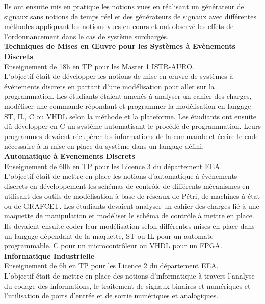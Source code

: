 \documentclass[11pt,a4paper,sans]{moderncv}         %
\begin{document}
{  Ils ont ensuite mis en pratique les notions vues en r\'ealisant un g\'en\'erateur de signaux sans notions de temps r\'eel et des g\'en\'erateurs de signaux avec diff\'erentes m\'ethodes appliquant les notions vues en cours et ont observ\'e les effets de l'ordonnancement dans le cas de syst\`eme surcharg\'es.\\
  \textbf{Techniques de Mises en \OE uvre pour les Syst\`emes \`a Ev\`enements Discrets}\\
  Enseignement de 18h en TP pour les Master 1 ISTR-AURO.\\
  L'objectif \'etait de d\'evelopper les notions de mise en \oe uvre de syst\`emes \`a \'ev\'enements discrets en partant d'une mod\'elisation pour aller sur la programmation.
  Les \'etudiants \'etaient amen\'es \`a analyser un cahier des charges, mod\'eliser une commande r\'epondant et programmer la mod\'elisation en langage ST, IL, C ou VHDL selon la m\'ethode et la plateforme.
  Les \'etudiants ont ensuite d\^u d\'evelopper en C un syst\`eme automatisant le proc\'ed\'e de programmation.
  Leurs programmes devaient r\'ecup\'erer les informations de la commande et \'ecrire le code n\'ecessaire \`a la mise en place du syst\`eme dans un langage d\'efini.\\
  \textbf{Automatique \`a Evenements Discrets}\\
  Enseignement de 60h en TP pour les Licence 3 du d\'epartement EEA.\\
  L'objectif \'etait de mettre en place les notions d'automatique \`a \'ev\'enements discrets en d\'eveloppement les sch\'emas de contr\^ole de diff\'erents m\'ecanismes en utilisant des outils de mod\'elisation \`a base de r\'eseaux de P\'etri, de machines \`a \'etat ou de GRAFCET.
  Les \'etudiants devaient analyser un cahier des charges li\'e \`a une maquette de manipulation et mod\'eliser le sch\'ema de contr\^ole \`a mettre en place.
  Ils devaient ensuite coder leur mod\'elisation selon diff\'erentes mises en place dans un langage d\'ependant de la maquette, ST ou IL pour un automate programmable, C pour un microcontr\^oleur ou VHDL pour un FPGA.\\
  \textbf{Informatique Industrielle}\\
  Enseignement de 6h en TP pour les Licence 2 du d\'epartement EEA.\\
  L'objectif \'etait de mettre en place des notions d'informatique \`a travers l'analyse du codage des informations, le traitement de signaux binaires et num\'eriques et l'utilisation de ports d'entr\'ee et de sortie num\'eriques et analogiques.
}
\end{document}
